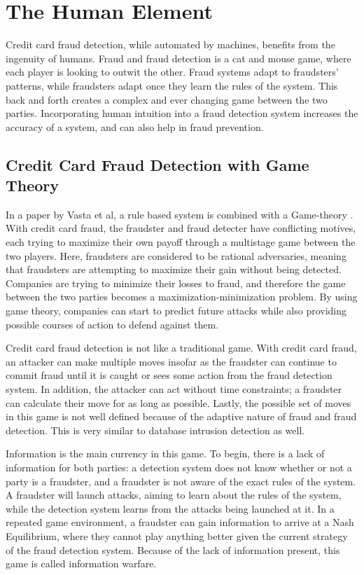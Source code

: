 \documentclass[midd]{thesis}
\begin{document}
\section{The Human Element}

Credit card fraud detection, while automated by machines, benefits from the ingenuity of humans. Fraud and fraud detection is a cat and mouse game, where each player is looking to outwit the other. Fraud systems adapt to fraudsters' patterns, while fraudsters adapt once they learn the rules of the system. This back and forth creates a complex and ever changing game between the two parties. Incorporating human intuition into a fraud detection system increases the accuracy of a system, and can also help in fraud prevention. 

\subsection{Credit Card Fraud Detection with Game Theory}

 
In a paper by Vasta et al, a rule based system is combined with a Game-theory \cite{Vasta2007}. With credit card fraud, the fraudster and fraud detecter have conflicting motives, each trying to maximize their own payoff through a multistage game between the two players. Here, fraudsters are considered to be rational adversaries, meaning that fraudsters are attempting to maximize their gain without being detected. Companies are trying to minimize their losses to fraud, and therefore the game between the two parties becomes a maximization-minimization problem. By using game theory, companies can start to predict future attacks while also providing possible courses of action to defend against them.
 
Credit card fraud detection is not like a traditional game. With credit card fraud, an attacker can make multiple moves insofar as the fraudster can continue to commit fraud until it is caught or sees some action from the fraud detection system. In addition, the attacker can act without time constraints; a fraudster can calculate their move for as long as possible. Lastly, the possible set of moves in this game is not well defined because of the adaptive nature of fraud and fraud detection. This is very similar to database intrusion detection as well. 

Information is the main currency in this game. To begin, there is a lack of information for both parties: a detection system does not know whether or not a party is a fraudster, and a fraudster is not aware of the exact rules of the system. A fraudster will launch attacks, aiming to learn about the rules of the system, while the detection system learns from the attacks being launched at it. In a repeated game environment, a fraudster can gain information to arrive at a Nash Equilibrium, where they cannot play anything better given the current strategy of the fraud detection system. Because of the lack of information present, this game is called information warfare.
\end{document}
